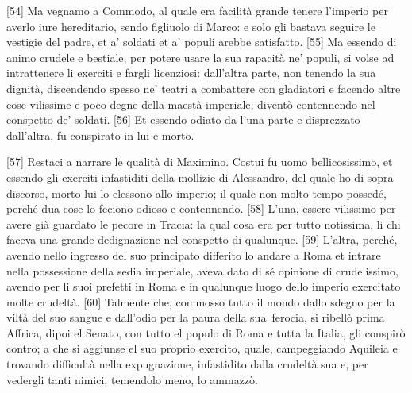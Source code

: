 \pagebreak

{[}54{]} Ma vegnamo a Commodo, al quale era facilità grande tenere
l'imperio per averlo iure hereditario, sendo figliuolo di Marco: e solo
gli bastava seguire le vestigie del padre, et a' soldati et a' populi
arebbe satisfatto. {[}55{]} Ma essendo di animo crudele e bestiale, per
potere usare la sua rapacità ne' populi, si volse ad intrattenere li
exerciti e fargli licenziosi: dall'altra parte, non tenendo la sua
dignità, discendendo spesso ne' teatri a combattere con gladiatori e
facendo altre cose vilissime e poco degne della maestà imperiale,
diventò contennendo nel conspetto de' soldati. {[}56{]} Et essendo
odiato da l'una parte e disprezzato dall'altra, fu conspirato in lui e
morto.

{[}57{]} Restaci a narrare le qualità di Maximino. Costui fu uomo
bellicosissimo, et essendo gli exerciti infastiditi della mollizie di
Alessandro, del quale ho di sopra discorso, morto lui lo elessono allo
imperio; il quale non molto tempo possedé, perché dua cose lo feciono
odioso e contennendo. {[}58{]} L'una, essere vilissimo per avere già
guardato le pecore in Tracia: la qual cosa era per tutto notissima, li
chi faceva una grande dedignazione nel conspetto di qualunque. {[}59{]}
L'altra, perché, avendo nello ingresso del suo principato differito lo
andare a Roma et intrare nella possessione della sedia imperiale, aveva
dato di sé opinione di crudelissimo, avendo per li suoi prefetti in Roma
e in qualunque luogo dello imperio exercitato molte crudeltà. {[}60{]}
Talmente che, commosso tutto il mondo dallo sdegno per la viltà del suo
sangue e dall'odio per la paura della sua\est\ ferocia, si ribellò prima
Affrica, dipoi el Senato, con tutto el populo di Roma e tutta la Italia,
gli conspirò contro; a che si aggiunse el suo proprio exercito, quale,
campeggiando Aquileia e trovando difficultà nella expugnazione,
infastidito dalla crudeltà sua e, per vedergli tanti nimici, temendolo
meno, lo ammazzò.

